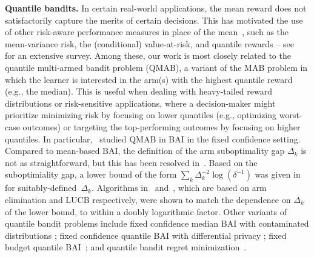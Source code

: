 \textbf{Quantile bandits.}
In certain real-world applications, the mean reward does not satisfactorily capture the merits of certain decisions. 
This has motivated the use of other risk-aware performance measures in place of the mean~\cite{yu2013sample}, such as the mean-variance risk, the (conditional) value-at-risk, and quantile rewards -- see~\cite{tan2022survey} for an extensive survey.
Among these, our work is most closely related to
the quantile multi-armed bandit problem (QMAB), a variant of the MAB problem in which the learner is interested in the arm(s) with the highest quantile reward (e.g., the median).
This is useful when dealing with heavy-tailed reward distributions or risk-sensitive applications, where a decision-maker might prioritize minimizing risk by focusing on lower quantiles (e.g., optimizing worst-case outcomes) or targeting the top-performing outcomes by focusing on higher quantiles.
In particular,~\cite{szorenyi2015qualitative, david2016pure, nikolakakis2021quantile, howard2022sequential} studied QMAB in BAI in the fixed confidence setting. Compared to mean-based BAI, the definition of the arm suboptimality gap $\Delta_k$ is not as straightforward, but this has been resolved in~\cite{nikolakakis2021quantile, howard2022sequential}. Based on the suboptimiality gap, a lower bound of the form $\sum_{k} \Delta_k^{-2} \log(\delta^{-1})$ was given in~\cite{nikolakakis2021quantile} for suitably-defined~$\Delta_k$. 
Algorithms in~\cite{nikolakakis2021quantile} and~\cite{howard2022sequential}, which are based on arm elimination and LUCB respectively, were shown to match the dependence on $\Delta_k$ of the lower bound, to within a doubly logarithmic factor. 
Other variants of quantile bandit problems include
fixed confidence median BAI with contaminated distributions \cite{altschuler2019best};
fixed confidence quantile BAI with differential privacy \cite{nikolakakis2021quantile}; fixed budget quantile BAI~\cite{zhang2021quantile}; and
quantile bandit regret minimization~\cite{torossian2019mathcal}.

